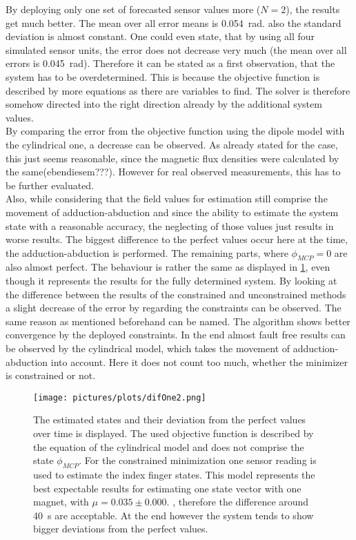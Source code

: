 By deploying only one set of forecasted sensor values more ($ N = 2 $), the results get much better. The mean over all error means is \SI{0.054}{\radian}. also the standard deviation is almost constant. One could even state, that by using all four simulated sensor units, the error does not decrease very much (the mean over all errors is \SI{0.045}{\radian}). Therefore it can be stated as a first observation, that the system has to be overdetermined. This is because the objective function is described by more equations as there are variables to find. The solver is therefore somehow directed into the right direction already by the additional system values.\\
By comparing the error from the objective function using the dipole model with the cylindrical one, a decrease can be observed. As already stated for the \grqq case, this just seems reasonable, since the magnetic flux densities were calculated by the same(ebendiesem???). However for real observed measurements, this has to be further evaluated.\\
Also, while considering that the field values for estimation still comprise the movement of adduction-abduction and since the ability to estimate the system state with a reasonable accuracy, the neglecting of those values just results in worse results. The biggest difference to the perfect values occur here at the time, the adduction-abduction is performed. The remaining parts, where $ \phi_{MCP} = 0 $ are also almost perfect. The behaviour is rather the same as displayed in \ref{fig:11cylNa1}, even though it represents the results for the fully determined system. By looking at the difference between the results of the constrained and unconstrained methods a slight decrease of the error by regarding the constraints can be observed. The same reason as mentioned beforehand can be named. The algorithm shows better convergence by the deployed constraints. In the end almost fault free results can be observed by the cylindrical model, which takes the movement of adduction-abduction into account. Here it does not count too much, whether the minimizer is constrained or not. %
\begin{figure}[!htb]
\centering
\texttt{[image: pictures/plots/difOne2.png]}
\caption[Estimated states vs. perfect states for using one magnet, one sensor.]
{The estimated states and their deviation from the perfect values over time is displayed. The used objective function is described by the equation of the cylindrical model and does not comprise the state $ \phi_{MCP} $. For the constrained minimization one sensor reading is used to estimate the index finger states. This model represents the best expectable results for estimating one state vector with one magnet, with $ \mu = 0.035 \pm 0.000 $. , therefore the difference around \SI{40}{\second} are acceptable. At the end however the system tends to show bigger deviations from the perfect values.}
\label{fig:11cylNa1}
\end{figure}
\FloatBarrier

